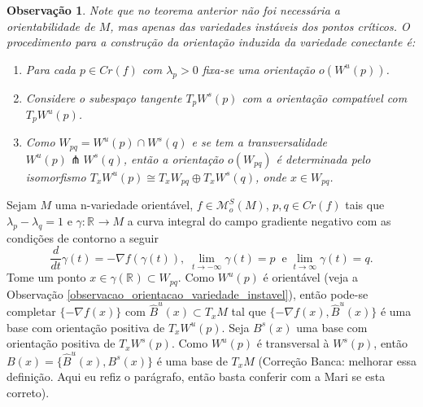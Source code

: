 \documentclass[12pt]{book}
\newtheorem{observacao}[teorema]{Observação}
\newcommand{\derivada}[2]{\frac{d #1}{d #2}}
\newcommand{\espacotangenteponto}[2]{T_{#1}#2}
\newcommand{\funcoesmorsesmale}[1]{\mathcal{M}^{S}_{o}(#1)}
\newcommand{\gradiente}{\nabla f}
\newcommand{\pontoscriticos}[1]{\textit{Cr}(#1)}
\newcommand{\real}[1]{\mathbb{R}^{#1}}
\newcommand{\reta}{\real{}}
\newcommand{\variedadeconectantepontos}[2]{W_{#1#2}}
\newcommand{\variedadeestavel}[1]{W^{s}(#1)}
\newcommand{\variedadeinstavel}[1]{W^{u}(#1)}
\newcommand{\alerta}[1]{{\color{red}#1}}
\newcommand{\correcaobanca}[1]{\alerta{(Correção Banca: #1)}}
\begin{document}
	\begin{observacao}
		Note que no teorema anterior não foi necessária a orientabilidade de $M$, mas apenas das variedades instáveis dos pontos críticos. O procedimento para a construção da orientação induzida da variedade conectante é:
		\begin{enumerate}
			\item Para cada $p\in \pontoscriticos{f}$ com $\lambda_{p}>0$ fixa-se uma orientação $o(\variedadeinstavel{p})$.
			
			\item Considere o subespaço tangente $\espacotangenteponto{p}{\variedadeestavel{p}}$ com a orientação compatível com $\espacotangenteponto{p}{\variedadeinstavel{p}}$.
			
			\item Como $\variedadeconectantepontos{p}{q} = \variedadeinstavel{p}\cap\variedadeestavel{q}$ e se tem a transversalidade $\variedadeinstavel{p}\pitchfork\variedadeestavel{q}$, então a orientação $o(\variedadeconectantepontos{p}{q})$ é determinada pelo isomorfismo $\espacotangenteponto{x}{\variedadeinstavel{p}}\cong \espacotangenteponto{x}{\variedadeconectantepontos{p}{q}}\oplus \espacotangenteponto{x}{\variedadeestavel{q}}$, onde $x \in \variedadeconectantepontos{p}{q}$.
		\end{enumerate}
	\end{observacao}

	Sejam $M$ uma n-variedade orientável, $f \in \funcoesmorsesmale{M}$, $p,q\in \pontoscriticos{f}$ tais que $\lambda_{p}-\lambda_{q} = 1$ e $\gamma :\reta \to M$ a curva integral do campo gradiente negativo com as condições de contorno a seguir
	$$
	\derivada{}{t}\gamma(t) = -\gradiente(\gamma(t)), \; \lim_{t \to -\infty}\gamma(t) = p\;\;\text{e}\; \lim_{t \to \infty}\gamma(t) = q.
	$$
	Tome um ponto $x \in \gamma(\reta) \subset \variedadeconectantepontos{p}{q}$. Como $\variedadeinstavel{p}$ é orientável (veja a Observação \ref{observacao_orientacao_variedade_instavel}), então pode-se completar $\{-\gradiente(x)\}$ com $\hat{B}^{u}(x) \subset \espacotangenteponto{x}{M}$ tal que $\{-\gradiente(x), \hat{B}^{u}(x)\}$ é uma base com orientação positiva de $\espacotangenteponto{x}{\variedadeinstavel{p}}$. Seja $B^{s}(x)$ uma base com orientação positiva de $\espacotangenteponto{x}{\variedadeestavel{p}}$.  Como $\variedadeinstavel{p}$ é transversal à $\variedadeestavel{p}$, então $B(x)=\{ \hat{B}^{u}(x), B^{s}(x)\}$ é uma base de $\espacotangenteponto{x}{M}$ \correcaobanca{melhorar essa definição. Aqui eu refiz o parágrafo, então basta conferir com a Mari se esta correto}.
	
\end{document}
